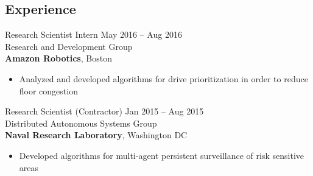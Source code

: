 \documentclass[line,margin]{cv}
\begin{document}
\begin{resume}
%
%

%
%

\section{Experience}

%
%
%

Research Scientist Intern
\hfill May 2016 -- Aug 2016 \\
Research and Development Group\\
\textbf{Amazon Robotics}, Boston
\begin{itemize}

    \item Analyzed and developed algorithms for drive prioritization
        in order to reduce floor congestion

\end{itemize}

Research Scientist (Contractor)
\hfill Jan 2015 -- Aug 2015 \\
Distributed Autonomous Systems Group\\
\textbf{Naval Research Laboratory}, Washington DC
\begin{itemize}

    \item Developed algorithms for multi-agent persistent surveillance of
        risk sensitive areas


\end{itemize}
\end{resume}
\end{document}
